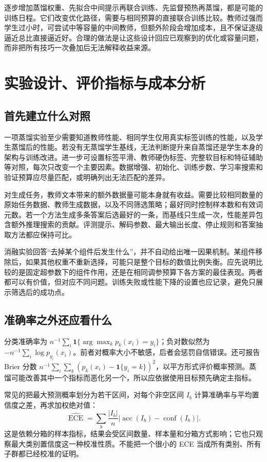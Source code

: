 \documentclass[UTF8,12pt,a4paper,fontset=fandol]{ctexart}
\begin{document}
逐步增加蒸馏权重、先拟合中间提示再联合训练、先监督预热再蒸馏，都是可能的训练日程。它们改变优化路径，需要与相同预算的直接联合训练比较。教师过强而学生过小时，可尝试中等容量的中间教师，但额外阶段会增加成本，且不保证逐级逼近总比直接逼近好。合理的做法是让这些设计回应已观察到的优化或容量问题，而非把所有技巧一次叠加后无法解释收益来源。

\section{实验设计、评价指标与成本分析}
\label{sec:kd-evaluation}

\subsection{首先建立什么对照}
一项蒸馏实验至少需要知道教师性能、相同学生仅用真实标签训练的性能，以及学生蒸馏后的性能。若没有无蒸馏学生基线，无法判断提升来自蒸馏还是学生本身的架构与训练改进。进一步可设置标签平滑、教师硬伪标签、完整软目标和特征辅助等对照，每次只改变一个主要因素。数据增强、初始化、训练步数、学习率搜索和验证预算应尽量匹配，或明确列出无法匹配的差异。

对生成任务，教师文本带来的额外数据量可能本身就有收益。需要比较相同数量的原始任务数据、教师生成数据，以及不同筛选策略；最好同时控制样本数和有效词元数。若一个方法生成多条答案后选最好的一条，而基线只生成一次，性能差异包含额外推理搜索的贡献。评测提示、解码参数、最大输出长度、停止规则和答案抽取方法都应保持可比。

消融实验回答“去掉某个组件后发生什么”，并不自动给出唯一因果机制。某组件移除后，如果其他权重不重新选择，可能只是整个目标的数值比例失衡。应先说明比较的是固定超参数下的组件作用，还是在相同调参预算下各方案的最佳表现。两者都可以有价值，但对应不同问题。训练失败或性能下降的设置也应记录，避免只展示筛选后的成功点。

\subsection{准确率之外还应看什么}
分类准确率为 $n^{-1}\sum_i\mathbf1\{\arg\max_kp_k(x_i)=y_i\}$；负对数似然为 $-n^{-1}\sum_i\log p_{y_i}(x_i)$。前者对概率大小不敏感，后者会惩罚自信错误。还可报告 Brier 分数 $n^{-1}\sum_i\sum_k(p_k(x_i)-\mathbf1\{y_i=k\})^2$，以平方形式评价概率预测。蒸馏可能改善其中一个指标而恶化另一个，所以应依据使用目标预先确定主指标。

常见的把最大预测概率划分为若干区间，对每个非空区间 $I_b$ 计算准确率与平均置信度之差，再求加权绝对值：
\[
 \widehat{\operatorname{ECE}}=\sum_b\frac{|I_b|}{n}
 \left|\operatorname{acc}(I_b)-\operatorname{conf}(I_b)\right|.
\]
这是依赖分箱的样本指标，结果会受区间数量、样本量和分箱方式影响；它也只观察最大类别置信度这一种校准性质。不能把一个很小的 ECE 当成所有类别、所有子群都已经校准的证明。
\end{document}
